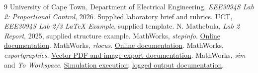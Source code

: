 \begingroup\small\setlength{\parskip}{2pt}
\begin{thebibliography}{9}
 University of Cape Town, Department of Electrical Engineering, \emph{EEE3094S Lab 2: Proportional Control}, 2026. Supplied laboratory brief and rubrics.
 UCT, \emph{EEE3094S Lab 2/3 LaTeX Example}, supplied template. N. Mathebula, \emph{Lab 2 Report}, 2025, supplied structure example.
 MathWorks, \emph{stepinfo}. \href{https://www.mathworks.com/help/control/ref/dynamicsystem.stepinfo.html}{Online documentation}.
 MathWorks, \emph{rlocus}. \href{https://www.mathworks.com/help/control/ref/dynamicsystem.rlocus.html}{Online documentation}.
 MathWorks, \emph{exportgraphics}. \href{https://www.mathworks.com/help/matlab/ref/exportgraphics.html}{Vector PDF and image export documentation}.
 MathWorks, \emph{sim} and \emph{To Workspace}. \href{https://www.mathworks.com/help/simulink/slref/sim.html}{Simulation execution}; \href{https://www.mathworks.com/help/simulink/slref/toworkspace.html}{logged output documentation}.
\end{thebibliography}\endgroup
